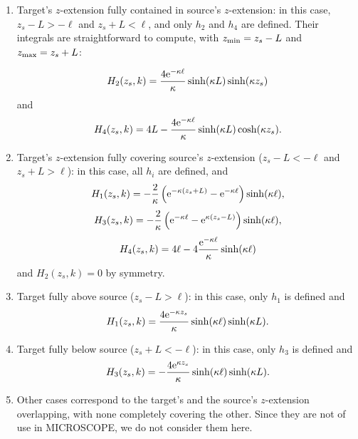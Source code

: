 \documentclass[12pt]{iopart}
\begin{document}
\begin{enumerate}

\item Target's $z$-extension fully contained in source's $z$-extension:
in this case, $z_s-L > -\ell$ and $z_s + L < \ell$, and only $h_2$ and $h_4$ are defined. Their integrals are straightforward to compute, with $z_{\rm min} = z_s - L$ and $z_{\rm max} = z_s + L$:

\begin{equation}
H_2(z_s, k) = \frac{4 {\rm e}^{-\kappa \ell}}{\kappa} \sinh(\kappa L) \sinh (\kappa z_s)
\end{equation}
and
\begin{equation}
H_4(z_s, k) = 4L - \frac{4 {\rm e}^{-\kappa \ell}}{\kappa} \sinh(\kappa L) \cosh (\kappa z_s).
\end{equation}

\item Target's $z$-extension fully covering source's $z$-extension ($z_s - L < -\ell$ and $z_s + L > \ell$): in this case, all $h_i$ are defined, and
\begin{equation}
H_1(z_s, k) = -\frac{2}{\kappa} \left({\rm e}^{-\kappa(z_s+L)} - {\rm e}^{-\kappa \ell} \right) \sinh(\kappa \ell),
\end{equation}
\begin{equation}
H_3(z_s, k) = -\frac{2}{\kappa} \left({\rm e}^{-\kappa \ell} - {\rm e}^{\kappa(z_s-L)} \right) \sinh(\kappa \ell),
\end{equation}
\begin{equation}
H_4(z_s, k) = 4\ell - 4 \frac{{\rm e}^{-\kappa \ell}}{\kappa} \sinh(\kappa \ell)
\end{equation}
and $H_2(z_s, k)=0$ by symmetry.

\item Target fully above source ($z_s - L > \ell$): in this case, only $h_1$ is defined and
\begin{equation}
H_1(z_s, k) = \frac{4 {\rm e}^{-\kappa z_s}}{\kappa} \sinh(\kappa \ell) \sinh(\kappa L).
\end{equation}

\item Target fully below source ($z_s + L < -\ell$): in this case, only $h_3$ is defined and
\begin{equation}
H_3(z_s, k) = -\frac{4 {\rm e}^{\kappa z_s}}{\kappa} \sinh(\kappa \ell) \sinh(\kappa L).
\end{equation}

\item Other cases correspond to the target's and the source's $z$-extension overlapping, with none completely covering the other. Since they are not of use in MICROSCOPE, we do not consider them here.

\end{enumerate}
\end{document}
